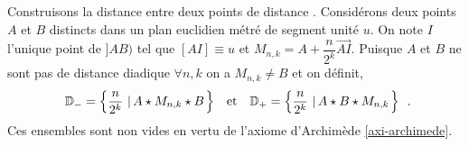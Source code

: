 Construisons la distance entre deux points de distance . Considérons deux points $A$ et $B$ distincts dans un plan euclidien métré de segment unité $u$. On note $I$ l'unique point de $]AB)$ tel que $[AI]\equiv u$ et $M_{n,k}= A + \dfrac{n}{2^k}\overrightarrow{AI}$. Puisque $A$ et $B$ ne sont pas de distance diadique $\forall n,k$ on a $M_{n,k}\neq B$ et on définit,
\begin{equation*}
\begin{array}{ccc}
     \mathbb{D}_- = \left\{\dfrac{n}{2^k}\,\left|\,A\star M_{n,k} \star B\right.\right\} &\text{et}& \mathbb{D}_+ = \left\{\dfrac{n}{2^k}\,\left|\,A \star B\star M_{n,k} \right.\right\} 
\end{array}\,.
\end{equation*}
Ces ensembles sont non vides en vertu de l'axiome d'Archimède \ref{axi-archimede}. 

